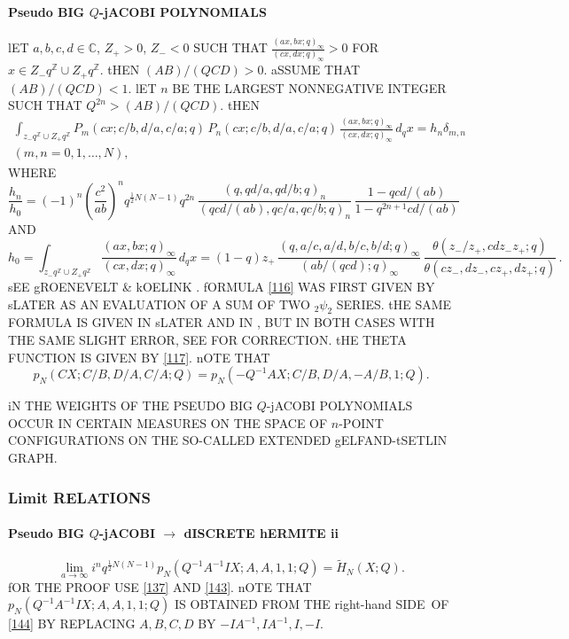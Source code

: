 \documentclass[twoside,11pt]{article}
\newcommand\CC{\mathbb{C}}
\newcommand\ZZ{\mathbb{Z}}
\newcommand\de\delta
\newcommand\tha\theta
\newcommand\half{\frac12}
\newcommand\iy\infty
\newcommand\wt{\widetilde}
\newcommand\RHS{right-hand SIDE}
\begin{document}
\paragraph{Pseudo BIG $Q$-jACOBI POLYNOMIALS} 
lET $a,b,c,d\in\CC$, $Z_+>0$, $Z_-<0$ SUCH THAT 
$\tfrac{(ax,bx;q)_\iy}{(cx,dx;q)_\iy}>0$ FOR $x\in Z_- q^\ZZ\cup Z_+ q^\ZZ$. 
tHEN $(AB)/(QCD)>0$. aSSUME THAT $(AB)/(QCD)<1$. 
lET $n$ BE THE LARGEST NONNEGATIVE INTEGER SUCH THAT $Q^{2n}>(AB)/(QCD)$. 
tHEN 
\begin{multline} 
\int_{z_- q^\ZZ\cup Z_+ q^\ZZ}P_m(cx;c/b,d/a,c/a;q)\,P_n(cx;c/b,d/a,c/a;q)\, 
\frac{(ax,bx;q)_\iy}{(cx,dx;q)_\iy}\,d_qx=h_n\de_{m,n}\\ 
(m,n=0,1,\ldots,N), 
\label{114} 
\end{multline} 
WHERE 
\begin{equation} 
\frac{h_n}{h_0}=(-1)^n\left(\frac{c^2}{ab}\right)^n q^{\half N(N-1)} q^{2n}\, 
\frac{(q,qd/a,qd/b;q)_n}{(qcd/(ab),qc/a,qc/b;q)_n}\, 
\frac{1-qcd/(ab)}{1-q^{2n+1}cd/(ab)} 
\label{115} 
\end{equation} 
AND 
\begin{equation} 
h_0=\int_{z_- q^\ZZ\cup Z_+ q^\ZZ}\frac{(ax,bx;q)_\iy}{(cx,dx;q)_\iy}\,d_qx 
=(1-q)z_+\, 
\frac{(q,a/c,a/d,b/c,b/d;q)_\iy}{(ab/(qcd);q)_\iy}\, 
\frac{\tha(z_-/z_+,cdz_-z_+;q)}{\tha(cz_-,dz_-,cz_+,dz_+;q)}\,. 
\label{116} 
\end{equation} 
sEE gROENEVELT \& kOELINK \cite[Prop.~2.2]{K14}. 
fORMULA \eqref{116} WAS FIRST GIVEN BY sLATER \cite[(5)]{K15} AS AN EVALUATION 
OF A SUM OF TWO ${}_2\psi_2$ SERIES. 
tHE SAME FORMULA IS GIVEN IN sLATER  AND IN 
, BUT IN BOTH CASES WITH THE SAME SLIGHT ERROR, 
SEE \cite[2nd PARAGRAPH AFTER lEMMA 2.1]{k14} FOR CORRECTION. 
tHE THETA FUNCTION IS GIVEN BY \eqref{117}. 
nOTE THAT 
\begin{equation} 
p_N(CX;C/B,D/A,C/A;Q)=p_N(-Q^{-1}AX;C/B,D/A,-A/B,1;Q). 
\label{145} 
\end{equation} 
 
iN \cite{K29} THE WEIGHTS OF THE PSEUDO BIG $Q$-jACOBI POLYNOMIALS 
OCCUR IN CERTAIN MEASURES ON THE SPACE OF $n$-POINT CONFIGURATIONS 
ON THE SO-CALLED EXTENDED gELFAND-tSETLIN GRAPH. 
% 
\subsubsection*{Limit RELATIONS} 
\paragraph{Pseudo BIG $Q$-jACOBI $\longrightarrow$ dISCRETE hERMITE ii} 
\begin{equation} 
\lim_{a\to\iy}i^n q^{\half N(N-1)} p_N(Q^{-1}A^{-1}IX;A,A,1,1;Q)= 
\wt H_N(X;Q). 
\label{144} 
\end{equation} 
fOR THE PROOF USE \eqref{137} AND \eqref{143}. 
nOTE THAT $p_N(Q^{-1}A^{-1}IX;A,A,1,1;Q)$ IS OBTAINED FROM THE 
\RHS\ OF \eqref{144} BY REPLACING $A,B,C,D$ BY $-IA^{-1},IA^{-1},I,-I$. 
% 
\end{document}
